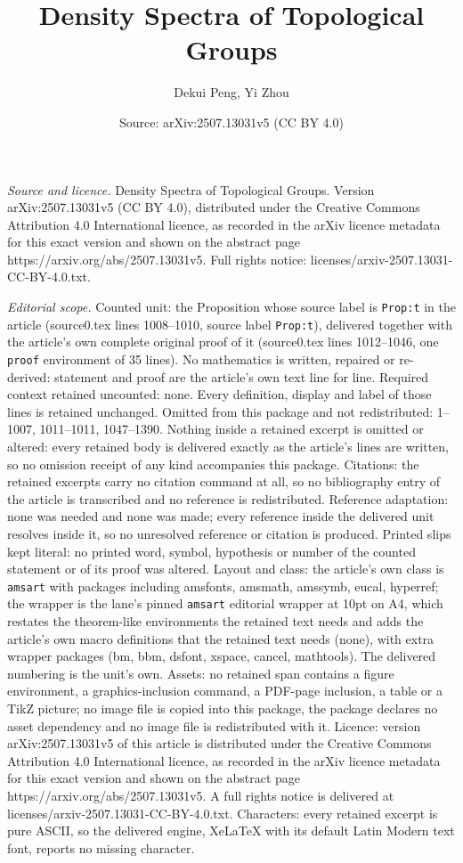 \documentclass[10pt,a4paper]{amsart}
\title[Density Spectra of Topological Groups]{Density Spectra of Topological Groups}
\author{Dekui Peng, Yi Zhou}
\date{Source: arXiv:2507.13031v5 (CC BY 4.0)}
\begin{document}
\maketitle

\noindent\emph{Source and licence.} Density Spectra of Topological Groups. Version arXiv:2507.13031v5 (CC BY 4.0), distributed under the Creative Commons Attribution 4.0 International licence, as recorded in the arXiv licence metadata for this exact version and shown on the abstract page https://arxiv.org/abs/2507.13031v5. Full rights notice: licenses/arxiv-2507.13031-CC-BY-4.0.txt.\par\smallskip

\noindent\textit{Editorial scope.} Counted unit: the Proposition whose source label is \texttt{Prop:t} in the article (source0.tex lines 1008--1010, source label \texttt{Prop:t}), delivered together with the article's own complete original proof of it (source0.tex lines 1012--1046, one \texttt{proof} environment of 35 lines). No mathematics is written, repaired or re-derived: statement and proof are the article's own text line for line. Required context retained uncounted: none. Every definition, display and label of those lines is retained unchanged. Omitted from this package and not redistributed: 1--1007, 1011--1011, 1047--1390. Nothing inside a retained excerpt is omitted or altered: every retained body is delivered exactly as the article's lines are written, so no omission receipt of any kind accompanies this package. Citations: the retained excerpts carry no citation command at all, so no bibliography entry of the article is transcribed and no reference is redistributed. Reference adaptation: none was needed and none was made; every reference inside the delivered unit resolves inside it, so no unresolved reference or citation is produced. Printed slips kept literal: no printed word, symbol, hypothesis or number of the counted statement or of its proof was altered. Layout and class: the article's own class is \texttt{amsart} with packages including amsfonts, amsmath, amssymb, eucal, hyperref; the wrapper is the lane's pinned \texttt{amsart} editorial wrapper at 10pt on A4, which restates the theorem-like environments the retained text needs and adds the article's own macro definitions that the retained text needs (none), with extra wrapper packages (bm, bbm, dsfont, xspace, cancel, mathtools). The delivered numbering is the unit's own. Assets: no retained span contains a figure environment, a graphics-inclusion command, a PDF-page inclusion, a table or a TikZ picture; no image file is copied into this package, the package declares no asset dependency and no image file is redistributed with it. Licence: version arXiv:2507.13031v5 of this article is distributed under the Creative Commons Attribution 4.0 International licence, as recorded in the arXiv licence metadata for this exact version and shown on the abstract page https://arxiv.org/abs/2507.13031v5. A full rights notice is delivered at licenses/arxiv-2507.13031-CC-BY-4.0.txt. Characters: every retained excerpt is pure ASCII, so the delivered engine, XeLaTeX with its default Latin Modern text font, reports no missing character.
\end{document}
